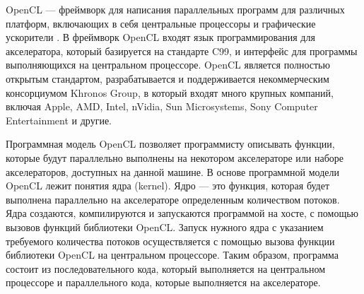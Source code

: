 OpenCL  — фреймворк для 
написания параллельных программ для различных платформ, включающих в
себя центральные процессоры и графические ускорители . В фреймворк OpenCL входят
язык программирования для акселератора, который базируется на стандарте C99, и
интерфейс для программы выполняющихся на центральном процессоре. OpenCL является
полностью открытым стандартом, разрабатывается и поддерживается некоммерческим консорциумом Khronos Group, 
в который входят много крупных компаний, включая Apple, AMD, Intel, nVidia, Sun Microsystems, Sony 
Computer Entertainment и другие.

Программная модель OpenCL позволяет программисту описывать функции, которые будут
параллельно выполнены на некотором акселераторе или наборе акселераторов, доступных на
данной машине.
В основе программной модели OpenCL лежит понятия ядра (kernel). Ядро — это функция,
которая будет выполнена параллельно на акселераторе определенным количеством
потоков. Ядра создаются, компилируются и запускаются программой на хосте, с помощью
вызовов функций библиотеки OpenCL. Запуск нужного ядра с указанием требуемого количества потоков
осуществляется с помощью вызова функции библиотеки OpenCL на центральном
процессоре. Таким образом, программа состоит из последовательного кода, который выполняется
на центральном процессоре и параллельного кода, которые выполняется на
акселераторе.
